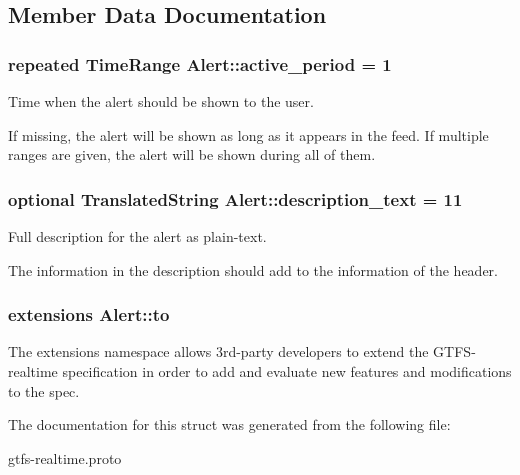 \subsection{Member Data Documentation}
\subsubsection[{\texorpdfstring{active\+\_\+period}{active_period}}]{\setlength{\rightskip}{0pt plus 5cm}repeated {\bf Time\+Range} Alert\+::active\+\_\+period = 1}\hypertarget{structAlert_aa51a558e2f4de6230d9c476330848f38}{}\label{structAlert_aa51a558e2f4de6230d9c476330848f38}


Time when the alert should be shown to the user. 

If missing, the alert will be shown as long as it appears in the feed. If multiple ranges are given, the alert will be shown during all of them. 
\subsubsection[{\texorpdfstring{description\+\_\+text}{description_text}}]{\setlength{\rightskip}{0pt plus 5cm}optional {\bf Translated\+String} Alert\+::description\+\_\+text = 11}\hypertarget{structAlert_ac75dc73c0e4fe3c3f8e1116e931ecde6}{}\label{structAlert_ac75dc73c0e4fe3c3f8e1116e931ecde6}


Full description for the alert as plain-\/text. 

The information in the description should add to the information of the header. 
\subsubsection[{\texorpdfstring{to}{to}}]{\setlength{\rightskip}{0pt plus 5cm}extensions Alert\+::to}\hypertarget{structAlert_ad23cbc49bf56755a6c2c9974a644bc72}{}\label{structAlert_ad23cbc49bf56755a6c2c9974a644bc72}


The extensions namespace allows 3rd-\/party developers to extend the G\+T\+F\+S-\/realtime specification in order to add and evaluate new features and modifications to the spec. 



The documentation for this struct was generated from the following file\+:\begin{DoxyCompactItemize}
\item 
gtfs-\/realtime.\+proto\end{DoxyCompactItemize}
